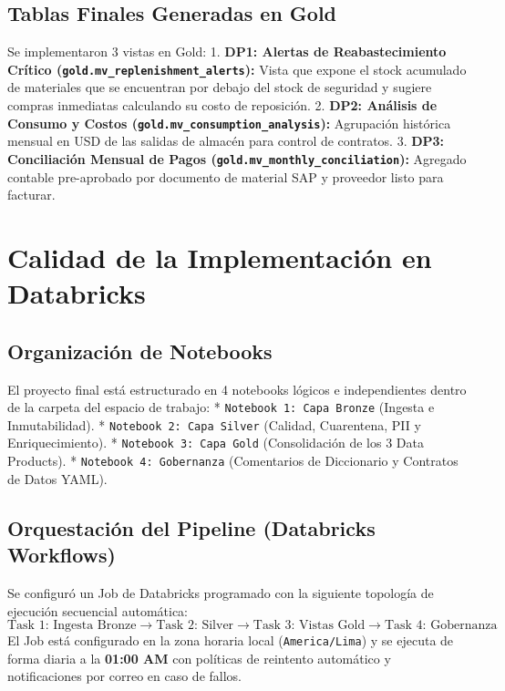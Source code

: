 \documentclass[11pt,a4paper]{article}
\begin{document}
\subsection{Tablas Finales Generadas en Gold}
Se implementaron 3 vistas en Gold:
1. \textbf{DP1: Alertas de Reabastecimiento Crítico (\texttt{gold.mv\_replenishment\_alerts}):} Vista que expone el stock acumulado de materiales que se encuentran por debajo del stock de seguridad y sugiere compras inmediatas calculando su costo de reposición.
2. \textbf{DP2: Análisis de Consumo y Costos (\texttt{gold.mv\_consumption\_analysis}):} Agrupación histórica mensual en USD de las salidas de almacén para control de contratos.
3. \textbf{DP3: Conciliación Mensual de Pagos (\texttt{gold.mv\_monthly\_conciliation}):} Agregado contable pre-aprobado por documento de material SAP y proveedor listo para facturar.

\newpage
\section{Calidad de la Implementación en Databricks}

\subsection{Organización de Notebooks}
El proyecto final está estructurado en 4 notebooks lógicos e independientes dentro de la carpeta del espacio de trabajo:
* \texttt{Notebook 1: Capa Bronze} (Ingesta e Inmutabilidad).
* \texttt{Notebook 2: Capa Silver} (Calidad, Cuarentena, PII y Enriquecimiento).
* \texttt{Notebook 3: Capa Gold} (Consolidación de los 3 Data Products).
* \texttt{Notebook 4: Gobernanza} (Comentarios de Diccionario y Contratos de Datos YAML).

\subsection{Orquestación del Pipeline (Databricks Workflows)}
Se configuró un Job de Databricks programado con la siguiente topología de ejecución secuencial automática:
$$\text{Task 1: Ingesta Bronze} \longrightarrow \text{Task 2: Silver} \longrightarrow \text{Task 3: Vistas Gold} \longrightarrow \text{Task 4: Gobernanza}$$
El Job está configurado en la zona horaria local (\texttt{America/Lima}) y se ejecuta de forma diaria a la \textbf{01:00 AM} con políticas de reintento automático y notificaciones por correo en caso de fallos.
\end{document}
